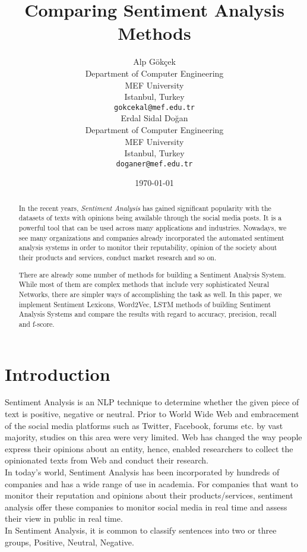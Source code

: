 \documentclass[11pt,a4paper]{article}
\title{Comparing Sentiment Analysis Methods}
\author{Alp Gökçek \\
  Department of Computer Engineering\\
  MEF University\\
  Istanbul, Turkey \\
  \texttt{gokcekal@mef.edu.tr} \\\And
  Erdal Sidal Doğan \\
  Department of Computer Engineering\\
  MEF University\\
  Istanbul, Turkey \\
  \texttt{doganer@mef.edu.tr} \\}
\date{\today}
\begin{document}
\maketitle
\begin{abstract}
In the recent years, \textit{Sentiment Analysis} has gained significant popularity with the datasets of texts with opinions being available through the social media posts. \cite{bing} It is a powerful tool that can be used across many applications and industries. Nowadays, we see many organizations and companies already incorporated the automated sentiment analysis systems in order to monitor their reputability, opinion of the society about their products and services, conduct market research and so on. \\ \par
There are already some number of methods for building a Sentiment Analysis System. While most of them are complex methods that include very sophisticated Neural Networks, there are simpler ways of accomplishing the task as well. In this paper, we implement Sentiment Lexicons, Word2Vec, LSTM methods of building Sentiment Analysis Systems and compare the results with regard to accuracy, precision, recall and f-score. 

\end{abstract}

\section{Introduction}
Sentiment Analysis is an NLP technique to determine whether the given piece of text is positive, negative or neutral. Prior to World Wide Web and embracement of the social media platforms such as Twitter, Facebook, forums etc. by vast majority, studies on this area were very limited. Web has changed the way people express their opinions about an entity, hence, enabled researchers to collect the opinionated texts from Web and conduct their research.\\

In today's world, Sentiment Analysis has been incorporated by hundreds of companies and has a wide range of use in academia. For companies that want to monitor their reputation and opinions about their products/services, sentiment analysis offer these companies to monitor social media in real time and assess their view in public in real time.\\

In Sentiment Analysis, it is common to classify sentences into two or three groups, Positive, Neutral, Negative. \\
\end{document}
